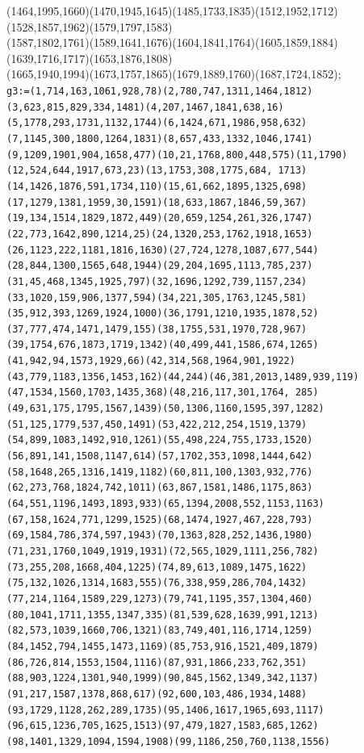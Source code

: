 \documentclass[a4paper,twopage,reqno,12pt]{amsart}
\theoremstyle{definition}
\numberwithin{equation}{section}
\begin{document}
\begin{enumerate}
{{(1464,1995,1660)(1470,1945,1645)(1485,1733,1835)(1512,1952,1712)(1528,1857,1962)(1579,1797,1583)\\(1587,1802,1761)(1589,1641,1676)(1604,1841,1764)(1605,1859,1884)(1639,1716,1717)(1653,1876,1808)\\(1665,1940,1994)(1673,1757,1865)(1679,1889,1760)(1687,1724,1852);}\\
\texttt{g3:=(1,714,163,1061,928,78)(2,780,747,1311,1464,1812)(3,623,815,829,334,1481)(4,207,1467,1841,638,16)
(5,1778,293,1731,1132,1744)(6,1424,671,1986,958,632)(7,1145,300,1800,1264,1831)(8,657,433,1332,1046,1741)
(9,1209,1901,904,1658,477)(10,21,1768,800,448,575)(11,1790)(12,524,644,1917,673,23)(13,1753,308,1775,684,
1713)(14,1426,1876,591,1734,110)(15,61,662,1895,1325,698)(17,1279,1381,1959,30,1591)(18,633,1867,1846,59,367)
(19,134,1514,1829,1872,449)(20,659,1254,261,326,1747)(22,773,1642,890,1214,25)(24,1320,253,1762,1918,1653)
(26,1123,222,1181,1816,1630)(27,724,1278,1087,677,544)(28,844,1300,1565,648,1944)(29,204,1695,1113,785,237)
(31,45,468,1345,1925,797)(32,1696,1292,739,1157,234)(33,1020,159,906,1377,594)(34,221,305,1763,1245,581)
(35,912,393,1269,1924,1000)(36,1791,1210,1935,1878,52)(37,777,474,1471,1479,155)(38,1755,531,1970,728,967)
(39,1754,676,1873,1719,1342)(40,499,441,1586,674,1265)(41,942,94,1573,1929,66)(42,314,568,1964,901,1922)
(43,779,1183,1356,1453,162)(44,244)(46,381,2013,1489,939,119)(47,1534,1560,1703,1435,368)(48,216,117,301,1764,
285)(49,631,175,1795,1567,1439)(50,1306,1160,1595,397,1282)(51,125,1779,537,450,1491)(53,422,212,254,1519,1379)
(54,899,1083,1492,910,1261)(55,498,224,755,1733,1520)(56,891,141,1508,1147,614)(57,1702,353,1098,1444,642)
(58,1648,265,1316,1419,1182)(60,811,100,1303,932,776)(62,273,768,1824,742,1011)(63,867,1581,1486,1175,863)
(64,551,1196,1493,1893,933)(65,1394,2008,552,1153,1163)(67,158,1624,771,1299,1525)(68,1474,1927,467,228,793)
(69,1584,786,374,597,1943)(70,1363,828,252,1436,1980)(71,231,1760,1049,1919,1931)(72,565,1029,1111,256,782)
(73,255,208,1668,404,1225)(74,89,613,1089,1475,1622)(75,132,1026,1314,1683,555)(76,338,959,286,704,1432)
(77,214,1164,1589,229,1273)(79,741,1195,357,1304,460)(80,1041,1711,1355,1347,335)(81,539,628,1639,991,1213)
(82,573,1039,1660,706,1321)(83,749,401,116,1714,1259)(84,1452,794,1455,1473,1169)(85,753,916,1521,409,1879)
(86,726,814,1553,1504,1116)(87,931,1866,233,762,351)(88,903,1224,1301,940,1999)(90,845,1562,1349,342,1137)
(91,217,1587,1378,868,617)(92,600,103,486,1934,1488)(93,1729,1128,262,289,1735)(95,1406,1617,1965,693,1117)
(96,615,1236,705,1625,1513)(97,479,1827,1583,685,1262)(98,1401,1329,1094,1594,1908)(99,1186,250,760,1138,1556)
}}
\end{enumerate}
\end{document}
